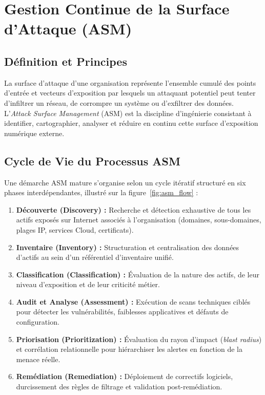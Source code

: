 \section{Gestion Continue de la Surface d'Attaque (ASM)}
\subsection{D\'efinition et Principes}
\par La surface d'attaque d'une organisation repr\'esente l'ensemble cumul\'e des points d'entr\'ee et vecteurs d'exposition par lesquels un attaquant potentiel peut tenter d'infiltrer un r\'eseau, de corrompre un syst\`eme ou d'exfiltrer des donn\'ees. L'\textit{Attack Surface Management} (ASM) est la discipline d'ing\'enierie consistant \`a identifier, cartographier, analyser et r\'eduire en continu cette surface d'exposition num\'erique externe.

\subsection{Cycle de Vie du Processus ASM}
\par Une d\'emarche ASM mature s'organise selon un cycle it\'eratif structur\'e en six phases interd\'ependantes, illustr\'e sur la figure~\ref{fig:asm_flow} :
\begin{enumerate}
    \item \textbf{D\'ecouverte (Discovery) :} Recherche et d\'etection exhaustive de tous les actifs expos\'es sur Internet associ\'es \`a l'organisation (domaines, sous-domaines, plages IP, services Cloud, certificats).
    \item \textbf{Inventaire (Inventory) :} Structuration et centralisation des donn\'ees d'actifs au sein d'un r\'ef\'erentiel d'inventaire unifi\'e.
    \item \textbf{Classification (Classification) :} \'Evaluation de la nature des actifs, de leur niveau d'exposition et de leur criticit\'e m\'etier.
    \item \textbf{Audit et Analyse (Assessment) :} Ex\'ecution de scans techniques cibl\'es pour d\'etecter les vuln\'erabilit\'es, faiblesses applicatives et d\'efauts de configuration.
    \item \textbf{Priorisation (Prioritization) :} \'Evaluation du rayon d'impact (\textit{blast radius}) et corr\'elation relationnelle pour hi\'erarchiser les alertes en fonction de la menace r\'eelle.
    \item \textbf{Rem\'ediation (Remediation) :} D\'eploiement de correctifs logiciels, durcissement des r\`egles de filtrage et validation post-rem\'ediation.
\end{enumerate}

